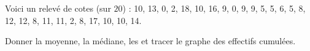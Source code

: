 
\begin{exercice}\label{exoSeconde-0027}

    Voici un relevé de cotes (sur \( 20\)) : 10, 13, 0, 2, 18, 10, 16, 9, 0, 9, 9, 5, 5, 6, 5, 8, 12, 12, 8, 11, 11, 2, 8, 17, 10, 10, 14.

    Donner la moyenne, la médiane, les  et tracer le graphe des effectifs cumulées.

\end{exercice}
